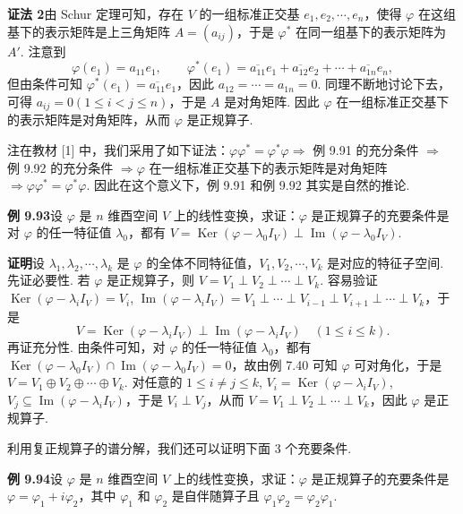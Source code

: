 \documentclass[UTF8, 12pt, fontset=fandol, oneside]{ctexart}
\begin{document}
\noindent\textbf{证法 2}\quad 由 Schur 定理可知，存在 $V$ 的一组标准正交基 $e_1,e_2,\cdots,e_n$，使得 $\varphi$ 在这组基下的表示矩阵是上三角矩阵 $A=(a_{ij})$，于是 $\varphi^*$ 在同一组基下的表示矩阵为 $A'$. 注意到
\[
\varphi(e_1)=a_{11}e_1,\qquad \varphi^*(e_1)=\overline{a_{11}}e_1+\overline{a_{12}}e_2+\cdots+\overline{a_{1n}}e_n,
\]
但由条件可知 $\varphi^*(e_1)=\overline{a_{11}}e_1$，因此 $a_{12}=\cdots=a_{1n}=0$. 同理不断地讨论下去，可得 $a_{ij}=0(1\le i<j\le n)$，于是 $A$ 是对角矩阵. 因此 $\varphi$ 在一组标准正交基下的表示矩阵是对角矩阵，从而 $\varphi$ 是正规算子.

注\quad 在教材 [1] 中，我们采用了如下证法：$\varphi\varphi^*=\varphi^*\varphi\Rightarrow$ 例 9.91 的充分条件 $\Rightarrow$ 例 9.92 的充分条件 $\Rightarrow\varphi$ 在一组标准正交基下的表示矩阵是对角矩阵 $\Rightarrow\varphi\varphi^*=\varphi^*\varphi$. 因此在这个意义下，例 9.91 和例 9.92 其实是自然的推论.

\noindent\textbf{例 9.93}\quad 设 $\varphi$ 是 $n$ 维酉空间 $V$ 上的线性变换，求证：$\varphi$ 是正规算子的充要条件是对 $\varphi$ 的任一特征值 $\lambda_0$，都有 $V=\operatorname{Ker}(\varphi-\lambda_0I_V)\perp\operatorname{Im}(\varphi-\lambda_0I_V)$.

\noindent\textbf{证明}\quad 设 $\lambda_1,\lambda_2,\cdots,\lambda_k$ 是 $\varphi$ 的全体不同特征值，$V_1,V_2,\cdots,V_k$ 是对应的特征子空间. 先证必要性. 若 $\varphi$ 是正规算子，则 $V=V_1\perp V_2\perp\cdots\perp V_k$. 容易验证 $\operatorname{Ker}(\varphi-\lambda_iI_V)=V_i$, $\operatorname{Im}(\varphi-\lambda_iI_V)=V_1\perp\cdots\perp V_{i-1}\perp V_{i+1}\perp\cdots\perp V_k$，于是
\[
V=\operatorname{Ker}(\varphi-\lambda_iI_V)\perp\operatorname{Im}(\varphi-\lambda_iI_V)\quad (1\le i\le k).
\]
再证充分性. 由条件可知，对 $\varphi$ 的任一特征值 $\lambda_0$，都有 $\operatorname{Ker}(\varphi-\lambda_0I_V)\cap\operatorname{Im}(\varphi-\lambda_0I_V)=0$，故由例 7.40 可知 $\varphi$ 可对角化，于是 $V=V_1\oplus V_2\oplus\cdots\oplus V_k$. 对任意的 $1\le i\ne j\le k$, $V_i=\operatorname{Ker}(\varphi-\lambda_iI_V)$, $V_j\subseteq\operatorname{Im}(\varphi-\lambda_iI_V)$，于是 $V_i\perp V_j$，从而 $V=V_1\perp V_2\perp\cdots\perp V_k$，因此 $\varphi$ 是正规算子.

利用复正规算子的谱分解，我们还可以证明下面 3 个充要条件.

\noindent\textbf{例 9.94}\quad 设 $\varphi$ 是 $n$ 维酉空间 $V$ 上的线性变换，求证：$\varphi$ 是正规算子的充要条件是 $\varphi=\varphi_1+i\varphi_2$，其中 $\varphi_1$ 和 $\varphi_2$ 是自伴随算子且 $\varphi_1\varphi_2=\varphi_2\varphi_1$.
\end{document}
